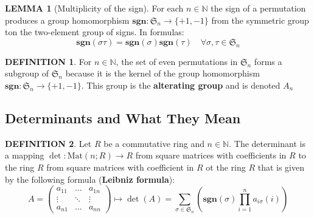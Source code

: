 \documentclass[10pt]{article}
\theoremstyle{definition}
\newtheorem{definition}{DEFINITION}[subsection]
\newcommand{\Mat}{\text{Mat}}
\newcommand{\sgn}{\textbf{sgn}}
\newtheorem{lemma}{LEMMA}[subsection]
\begin{document}
\begin{lemma}[Multiplicity of the sign]
    For each $n \in \mathbb{N}$ the sign of a permutation produces a group homomorphism $\textbf{sgn}: \mathfrak{S}_n \rightarrow \{+1,-1\}$ from the symmetric group ton the two-element group of signs. In formulas:
    $$\sgn(\sigma\tau) = \sgn(\sigma)\sgn(\tau) \quad \forall \sigma,\tau\in \mathfrak{S}_n$$
\end{lemma}

\begin{definition}
    For $n \in \mathbb{N}$, the set of even permutations in $\mathfrak{S}_n$ forms a subgroup of $\mathfrak{S}_n$ because it is the kernel of the group homomorphism $\sgn:\mathfrak{S}_n \rightarrow \{+1,-1\}$. This group is the \textbf{alterating group} and is denoted $A_n$
\end{definition}

\subsection{Determinants and What They Mean}
\begin{definition}
    Let $R$ be a commutative ring and $n \in \mathbb{N}$. The determinant is a mapping $\det : \Mat(n;R) \rightarrow R$ from square matrices with coefficients in $R$ to the ring $R$ from square matrices with coefficient in $R$ ot the ring $R$ that is given by the following formula (\textbf{Leibniz formula}):
    $$A = 
    \begin{pmatrix}
        a_{11} & ... & a_{1n}\\
        \vdots & \ddots & \vdots\\
        a_{n1} & ... & a_{nn}
    \end{pmatrix} \mapsto \det(A) = \sum_{\sigma \in \mathfrak{S}_n} \left(\sgn(\sigma)\prod_{i=1}^n a_{i\sigma}(i)\right)$$
\end{definition}


\end{document}
